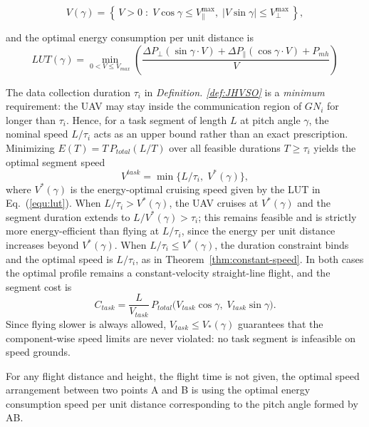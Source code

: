 \[
V(\gamma) = \left\{\, V > 0 \;:\; V\cos\gamma \le V_{\parallel}^{\max},\; |V\sin\gamma| \le V_{\perp}^{\max} \,\right\},
\]

and the optimal energy consumption per unit distance is
\begin{equation}
    LUT(\gamma) = \min_{0 < V \le V_{max}} \left( \frac{\Delta P_{\perp}(\sin\gamma \cdot V) + \Delta P_{\parallel}(\cos\gamma \cdot V) + P_{mh}}{V} \right)
    \label{equ:lut}
\end{equation}

\begin{remark}
\label{rem:task-speed}
    The data collection duration $\tau_i$ in \textit{Definition. \ref{def:JHVSO}} is a \textit{minimum} requirement: the UAV may stay inside the communication region of $GN_i$ for longer than $\tau_i$.
    Hence, for a task segment of length $L$ at pitch angle $\gamma$, the nominal speed $L/\tau_i$ acts as an upper bound rather than an exact prescription.
    Minimizing $E(T) = T\, P_{total}(L/T)$ over all feasible durations $T \ge \tau_i$ yields the optimal segment speed
    \[
    V^{task} = \min\big\{ L/\tau_i,\; V^{*}(\gamma) \big\},
    \]
    where $V^{*}(\gamma)$ is the energy-optimal cruising speed given by the LUT in Eq.~(\ref{equ:lut}).
    When $L/\tau_i > V^{*}(\gamma)$, the UAV cruises at $V^{*}(\gamma)$ and the segment duration extends to $L/V^{*}(\gamma) > \tau_i$; this remains feasible and is strictly more energy-efficient than flying at $L/\tau_i$, since the energy per unit distance increases beyond $V^{*}(\gamma)$.
    When $L/\tau_i \le V^{*}(\gamma)$, the duration constraint binds and the optimal speed is $L/\tau_i$, as in Theorem~\ref{thm:constant-speed}.
    In both cases the optimal profile remains a constant-velocity straight-line flight, and the segment cost is
    \begin{equation}
    C_{task} = \frac{L}{V_{task}}\, P_{total}\big(V_{task}\cos\gamma,\; V_{task}\sin\gamma\big).\label{eq:ctask}
    \end{equation}
    Since flying slower is always allowed, $V_{task} \le V_{*}(\gamma)$ guarantees that the component-wise speed limits are never violated: no task segment is infeasible on speed grounds.
\end{remark}

\begin{theorem}
\label{thm:optimal-range-speed}
For any flight distance and height, the flight time is not given, the optimal speed arrangement between two points A and B is using the optimal energy consumption speed per unit distance corresponding to the pitch angle formed by AB.
\end{theorem}

